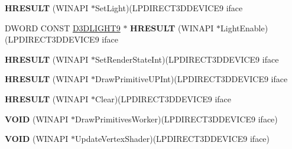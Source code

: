 \begin{DoxyCompactItemize}
\item 
\mbox{\label{struct___i_direct3_d_device9_vtbl___i_n_t_a93c42004e3a07947f0d0c1e1b1886971}} 
{\bfseries H\+R\+E\+S\+U\+LT} (W\+I\+N\+A\+PI $\ast$Set\+Light)(L\+P\+D\+I\+R\+E\+C\+T3\+D\+D\+E\+V\+I\+C\+E9 iface
\item 
\mbox{\label{struct___i_direct3_d_device9_vtbl___i_n_t_a7fc31084ff83fd14a69a2e76814cc1ac}} 
D\+W\+O\+RD C\+O\+N\+ST \hyperlink{struct___d3_d_l_i_g_h_t9}{D3\+D\+L\+I\+G\+H\+T9} $\ast$ {\bfseries H\+R\+E\+S\+U\+LT} (W\+I\+N\+A\+PI $\ast$Light\+Enable)(L\+P\+D\+I\+R\+E\+C\+T3\+D\+D\+E\+V\+I\+C\+E9 iface
\item 
\mbox{\label{struct___i_direct3_d_device9_vtbl___i_n_t_a5ce811879bd7287eaae8e7fb47832448}} 
{\bfseries H\+R\+E\+S\+U\+LT} (W\+I\+N\+A\+PI $\ast$Set\+Render\+State\+Int)(L\+P\+D\+I\+R\+E\+C\+T3\+D\+D\+E\+V\+I\+C\+E9 iface
\item 
\mbox{\label{struct___i_direct3_d_device9_vtbl___i_n_t_a269dcc84ab7859005c2389b1caf2573b}} 
{\bfseries H\+R\+E\+S\+U\+LT} (W\+I\+N\+A\+PI $\ast$Draw\+Primitive\+U\+P\+Int)(L\+P\+D\+I\+R\+E\+C\+T3\+D\+D\+E\+V\+I\+C\+E9 iface
\item 
\mbox{\label{struct___i_direct3_d_device9_vtbl___i_n_t_ab25f92d2290b9b192a12c90398da2241}} 
{\bfseries H\+R\+E\+S\+U\+LT} (W\+I\+N\+A\+PI $\ast$Clear)(L\+P\+D\+I\+R\+E\+C\+T3\+D\+D\+E\+V\+I\+C\+E9 iface
\item 
\mbox{\label{struct___i_direct3_d_device9_vtbl___i_n_t_a27cc9e60b817211a85a1aabd5c693d1c}} 
{\bfseries V\+O\+ID} (W\+I\+N\+A\+PI $\ast$Draw\+Primitives\+Worker)(L\+P\+D\+I\+R\+E\+C\+T3\+D\+D\+E\+V\+I\+C\+E9 iface)
\item 
\mbox{\label{struct___i_direct3_d_device9_vtbl___i_n_t_ae13c37256ed200adeceeb7f38d1e959f}} 
{\bfseries V\+O\+ID} (W\+I\+N\+A\+PI $\ast$Update\+Vertex\+Shader)(L\+P\+D\+I\+R\+E\+C\+T3\+D\+D\+E\+V\+I\+C\+E9 iface)
\item 
\mbox{\label{struct___i_direct3_d_device9_vtbl___i_n_t_ac69f979fdcd1e10f6c422a840d338196}} 

\end{DoxyCompactItemize}

